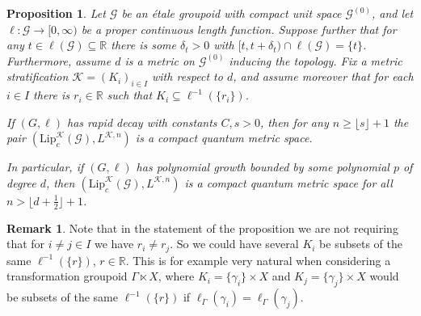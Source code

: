 \documentclass[11pt,a4paper,oneside,final,reqno]{amsart}
\newtheorem{proposition}[lemma]{Proposition}
\theoremstyle{definition}
\newtheorem{remark}[lemma]{Remark}
\newcommand{\G}{\mathcal{G}}
\newcommand{\Go}{\mathcal{G}^{(0)}}
\newcommand{\cK}{\mathcal{K}}
\newcommand{\Lip}{\mathrm{Lip}}
\newcommand{\R}{\mathbb{R}}
\numberwithin{equation}{section}
\begin{document}
	\begin{proposition}\label{prop:Christensen-Ivan-for-groupoids}
		Let $\G$ be an \'etale groupoid with compact unit space $\Go$, and let $\ell \colon \G \to [0,\infty)$ be a proper continuous length function.
		Suppose further that for any $t \in \ell(\G) \subseteq \R$ there is some $\delta_t>0$ with $[t, t+\delta_t) \cap \ell(\G) = \{t\}$. 
		Furthermore, assume $d$ is a metric on $\Go$ inducing the topology. 
		Fix a metric stratification $\cK = (K_i)_{i\in I}$ with respect to $d$, and assume moreover that for each $i \in I$ there is $r_i \in \R$ such that $K_i \subseteq \ell^{-1}(\{r_i\})$.
		
		If $(G, \ell)$ has rapid decay with constants $C,s >0$, then  
		for any $n \geq \lfloor s \rfloor +1$ the pair 
		$( \Lip_c^{\cK}(\G), L^{\cK, n})$
		is a compact quantum metric space. 
		
		In particular, if $(G,\ell)$ has polynomial growth  
		bounded by some polynomial $p$ of degree $d$, then $( \Lip_c^{\cK}(\G), L^{\cK, n})$ is a compact quantum metric space for all $n > \lfloor d + \frac{1}{2}\rfloor +1$. 
	\end{proposition}
	\begin{remark}
		Note that in the statement of the proposition we are not requiring that for $i\neq j\in I$ we have $r_i \neq r_j$. So we could have several $K_i$ be subsets of the same $\ell^{-1}(\{r\})$, $r \in \R$. This is for example very natural when considering a transformation groupoid $\Gamma \ltimes X$, where $K_i = \{\gamma_i\} \times X$ and $K_j = \{\gamma_j\} \times X$ would be subsets of the same $\ell^{-1}(\{r\})$ if $\ell_\Gamma(\gamma_i) = \ell_\Gamma(\gamma_j)$. 
	\end{remark}
\end{document}
